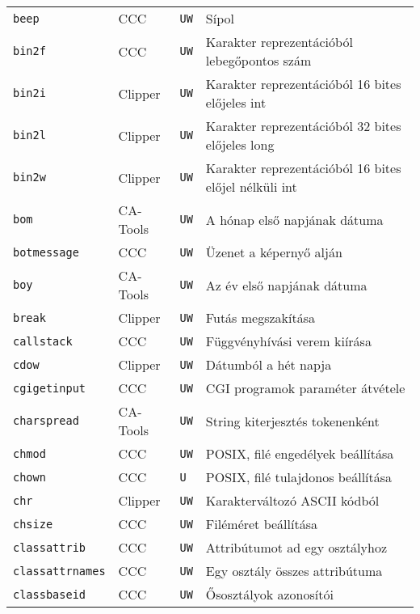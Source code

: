 \begin{tabular}{|l|l|l|l|}
\verb!beep!                        & CCC      &  {\tt UW} & Sípol\\
\verb!bin2f!                       & CCC      &  {\tt UW} & Karakter reprezentációból lebegőpontos szám\\
\verb!bin2i!                       & Clipper  &  {\tt UW} & Karakter reprezentációból 16 bites előjeles int\\
\verb!bin2l!                       & Clipper  &  {\tt UW} & Karakter reprezentációból 32 bites előjeles long\\
\verb!bin2w!                       & Clipper  &  {\tt UW} & Karakter reprezentációból 16 bites előjel nélküli int\\
\verb!bom!                         & CA-Tools &  {\tt UW} & A hónap első napjának dátuma\\
\verb!botmessage!                  & CCC      &  {\tt UW} & Üzenet a képernyő alján\\
\verb!boy!                         & CA-Tools &  {\tt UW} & Az év első napjának dátuma\\
\verb!break!                       & Clipper  &  {\tt UW} & Futás megszakítása\\
\verb!callstack!                   & CCC      &  {\tt UW} & Függvényhívási verem kiírása\\
\verb!cdow!                        & Clipper  &  {\tt UW} & Dátumból a hét napja\\
\verb!cgigetinput!                 & CCC      &  {\tt UW} & CGI programok paraméter átvétele\\
\verb!charspread!                  & CA-Tools &  {\tt UW} & String kiterjesztés tokenenként\\   
\verb!chmod!                       & CCC      &  {\tt UW} & POSIX, filé engedélyek beállítása\\
\verb!chown!                       & CCC      &  {\tt U~} & POSIX, filé tulajdonos beállítása\\
\verb!chr!                         & Clipper  &  {\tt UW} & Karakterváltozó ASCII kódból\\
\verb!chsize!                      & CCC      &  {\tt UW} & Filéméret beállítása\\
\verb!classattrib!                 & CCC      &  {\tt UW} & Attribútumot ad egy osztályhoz\\
\verb!classattrnames!              & CCC      &  {\tt UW} & Egy osztály összes attribútuma\\
\verb!classbaseid!                 & CCC      &  {\tt UW} & Ősosztályok azonosítói\\

\end{tabular}
